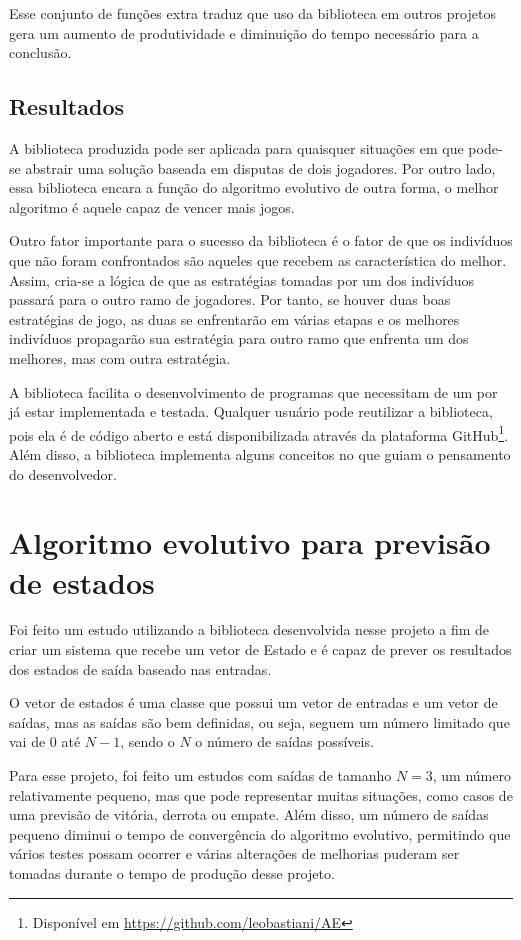 Esse conjunto de funções extra traduz que uso da biblioteca em outros projetos gera um aumento de produtividade e diminuição do tempo necessário para a conclusão.

\subsection{Resultados}

A biblioteca produzida pode ser aplicada para quaisquer situações em que pode-se abstrair uma solução baseada em disputas de dois jogadores. Por outro lado, essa biblioteca encara a função \fitness do algoritmo evolutivo de outra forma, o melhor algoritmo é aquele capaz de vencer mais jogos.

Outro fator importante para o sucesso da biblioteca é o fator de que os indivíduos que não foram confrontados são aqueles que recebem as característica do melhor. Assim, cria-se a lógica de que as estratégias tomadas por um dos indivíduos passará para o outro ramo de jogadores. Por tanto, se houver duas boas estratégias de jogo, as duas se enfrentarão em várias etapas e os melhores indivíduos propagarão sua estratégia para outro ramo que enfrenta um dos melhores, mas com outra estratégia.

A biblioteca facilita o desenvolvimento de programas que necessitam de um \SE por já estar implementada e testada. Qualquer usuário pode reutilizar a biblioteca, pois ela é de código aberto e está disponibilizada através da plataforma GitHub\footnote{Disponível em \url{https://github.com/leobastiani/AE}}. Além disso, a biblioteca implementa alguns conceitos no \SE que guiam o pensamento do desenvolvedor.

\section{Algoritmo evolutivo para previsão de estados}

Foi feito um estudo utilizando a biblioteca desenvolvida nesse projeto a fim de criar um sistema que recebe um vetor de Estado e é capaz de prever os resultados dos estados de saída baseado nas entradas.

O vetor de estados é uma classe que possui um vetor de entradas e um vetor de saídas, mas as saídas são bem definidas, ou seja, seguem um número limitado que vai de 0 até $N-1$, sendo o $N$ o número de saídas possíveis.

Para esse projeto, foi feito um estudos com saídas de tamanho $N=3$, um número relativamente pequeno, mas que pode representar muitas situações, como casos de uma previsão de vitória, derrota ou empate. Além disso, um número de saídas pequeno diminui o tempo de convergência do algoritmo evolutivo, permitindo que vários testes possam ocorrer e várias alterações de melhorias puderam ser tomadas durante o tempo de produção desse projeto.


